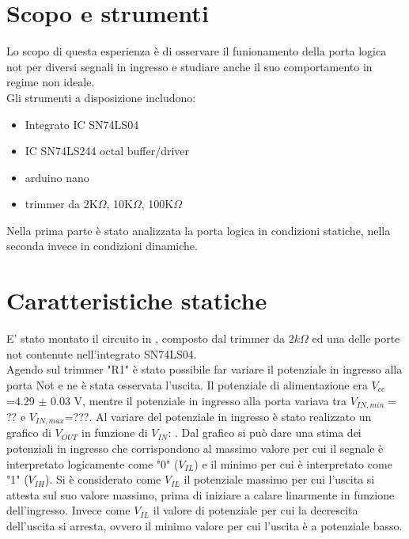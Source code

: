 \section{Scopo e strumenti}
Lo scopo di questa esperienza è di osservare il funionamento della porta logica not per diversi segnali in ingresso e studiare anche il suo comportamento in regime non ideale.\\
Gli strumenti a disposizione includono:
\begin{itemize}
\item{Integrato IC SN74LS04}
\item{IC SN74LS244 octal buffer/driver}
\item{arduino nano}
\item{trimmer da 2K$\Omega$, 10K$\Omega$, 100K$\Omega$}
\end{itemize}
Nella prima parte è stato analizzata la porta logica in condizioni statiche, nella seconda invece in condizioni dinamiche.\\

\section{Caratteristiche statiche}
E' stato montato il circuito in , composto dal trimmer da 2$k\Omega$ ed una delle porte not contenute nell'integrato SN74LS04.\\
 Agendo sul trimmer "R1" è stato possibile far variare il potenziale in ingresso alla porta Not e ne è stata osservata l'uscita. Il potenziale di alimentazione era $V_{cc}$=4.29 $\pm$ 0.03 V, mentre il potenziale in ingresso alla porta  variava tra $V_{IN,min}=$?? e $V_{IN,max}$=???. Al variare del potenziale in ingresso è stato realizzato un grafico di $V_{OUT}$ in funzione di $V_{IN}$: . Dal grafico si può dare una stima dei potenziali in ingresso che corrispondono al massimo valore per cui il segnale è interpretato logicamente come "0" ($V_{IL}$) e il minimo per cui è interpretato come "1" ($V_{IH}$). Si è considerato come $V_{IL}$ il potenziale massimo per cui l'uscita si attesta sul suo valore massimo, prima di iniziare a calare linarmente in funzione dell'ingresso. Invece come $V_{IL}$ il valore di potenziale per cui la decrescita dell'uscita si arresta, ovvero il minimo valore per cui l'uscita è a potenziale basso.\\